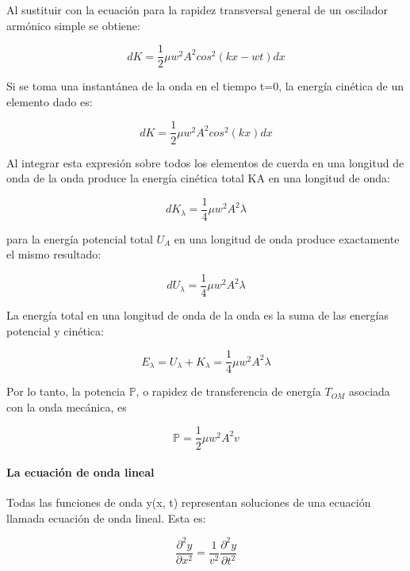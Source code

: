 \documentclass[10pt]{article}
\begin{document}
Al sustituir con la ecuación para la rapidez transversal general 
de un oscilador armónico simple se obtiene:

\begin{equation*}
    dK = \frac{1}{2} \mu w^2 A^2 cos^2 (kx-wt) dx 
\end{equation*}

Si se toma una instantánea de la onda en el tiempo t=0, la energía cinética de un elemento dado es:

\begin{equation*}
    dK = \frac{1}{2} \mu w^2 A^2 cos^2 (kx) dx 
\end{equation*}

Al integrar esta expresión sobre todos los elementos de cuerda en una longitud de onda
de la onda produce la energía cinética total KA en una longitud de onda:

\begin{equation*}
    dK_\lambda = \frac{1}{4} \mu w^2 A^2 \lambda 
\end{equation*}

para la energía potencial total $U_A$
en una longitud de onda produce exactamente el mismo resultado:

\begin{equation*}
    dU_\lambda = \frac{1}{4} \mu w^2 A^2 \lambda 
\end{equation*}

La energía total en una longitud de onda de la onda es la suma de las energías potencial
y cinética:

\begin{equation*}
    E_\lambda = U_\lambda + K_\lambda =  \frac{1}{4} \mu w^2 A^2 \lambda 
\end{equation*}

Por lo tanto, la potencia $\mathbb{P}$, o rapidez de transferencia de energía $T_{OM}$ asociada
con la onda mecánica, es

\begin{equation*}
    \mathbb{P} = \frac{1}{2} \mu w^2 A^2 v
\end{equation*}

\paragraph{La ecuación de onda lineal}

Todas las funciones de onda y(x, t) representan soluciones de
una ecuación llamada ecuación de onda lineal. Esta es:

\begin{equation*}
	\dfrac{\partial^{2} y}{\partial x^2} = \dfrac{1}{v^2} \dfrac{\partial^2 y}{\partial t^2}
\end{equation*}
\end{document}
